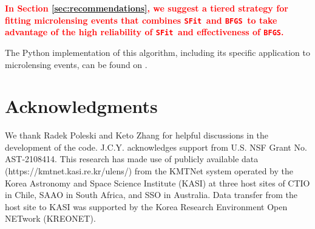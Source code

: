 \documentclass[preprint]{aastex631}
\newcommand{\HL}[1]{\textcolor{red}{\bf#1}}
\newcommand{\bfgs}{\texttt{BFGS}}
\newcommand{\sfit}{\texttt{SFit}}
\begin{document}
\HL{In Section \ref{sec:recommendations}, we suggest a tiered strategy for fitting microlensing events that combines \sfit\, and \bfgs\, to take advantage of the high reliability of \sfit\, and effectiveness of \bfgs.}

The Python implementation of this algorithm, including its specific application to microlensing events, can be found on .

\section*{Acknowledgments}

We thank Radek Poleski and Keto Zhang for helpful discussions in the development of the code.
J.C.Y. acknowledges support from U.S. NSF Grant No. AST-2108414. 
This research has made use of publicly available data 
(https://kmtnet.kasi.re.kr/ulens/) from the KMTNet system
operated by the Korea Astronomy and Space Science Institute
(KASI) at three host sites of CTIO in Chile, SAAO in South
Africa, and SSO in Australia. Data transfer from the host site to
KASI was supported by the Korea Research Environment
Open NETwork (KREONET).



\end{document}
